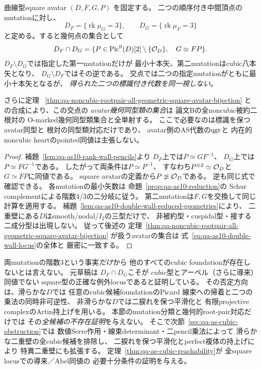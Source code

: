 \begin{proposition}[二つの最小十本矢壁と二捩れ交点]
\label{prop:qa-as10-double-wall-characterization}
曲線型square avatar $(D,F,G,P)$ を固定する。
二つの順序付き中間頂点のmutationに対し、
\[
 D_F=\{\operatorname{rk}\mu_G=3\},\qquad
 D_G=\{\operatorname{rk}\mu_F=3\}
\]
と定める。すると幾何点の集合として
\begin{equation}
 D_F\cap D_G=
 \{P\in\operatorname{Pic}^0(D)[2]\setminus\{\mathcal O_D\},\quad
     G\simeq FP\}.
 \label{eq:qa-as10-double-wall-locus}
\end{equation}
$D_F\setminus D_G$では指定した第一mutationだけが
最小十本矢、第二mutationはcubic八本矢となり、
$D_G\setminus D_F$ではその逆である。
交点では二つの指定mutationがともに最小十本矢となるが、
\emph{得られた二つの標識付き代数を同一視しない}。

さらに定理
~\ref{thm:qa-noncubic-rootpair-all-geometric-square-avatar-bijection}
との合成により、この交点の
\emph{avatar幾何同型類の集合}は
論文Bの全noncubic被約二根対の
O-marked幾何同型類集合と全単射する。
ここで必要なのは標識を保つavatar同型と
根対の同型類対応だけであり、
avatar側のAS代数の$\operatorname{qgr}$と
内在的noncubic heartのpointed同値は主張しない。
\end{proposition}
\begin{proof}
補題~\ref{lem:qa-as10-rank-wall-pencils}より
$D_F$上では$P\simeq GF^{-1}$、
$D_G$上では$P\simeq FG^{-1}$である。
したがって両条件は$P\simeq P^{-1}$、
すなわち$P^{\otimes2}\simeq\mathcal O_D$と
$G\simeq FP$に同値である。
square avatarの定義から$P\not\simeq\mathcal O_D$である。
逆も同じ式で確認できる。
各mutationの最小矢数は
命題~\ref{prop:qa-as10-reduction}の
Schur complementによる階数4/3の二分岐に従う。
第二mutationは$F,G$を交換して同じ計算を適用する。
補題~\ref{lem:qa-as10-double-wall-reduced-geometries}により、
二重壁にある$D$はsmooth/nodal/$I_2$の三型だけで、
非被約型・cuspidal型・接する二成分型は出現しない。
従って後述の
定理~\ref{thm:qa-noncubic-rootpair-all-geometric-square-avatar-bijection}
が扱うavatarの集合は
式~\eqref{eq:qa-as10-double-wall-locus}の全体と
厳密に一致する。
\end{proof}

\begin{remark}[cubicへの到達不能性には別の証明が必要]
\label{rem:qa-as10-two-walls-not-full-obstruction}
両mutationの階数3という事実\emph{だけ}から
他のすべてのcubic foundationが存在しないとは言えない。
元草稿\cite[定理21.1・35.1]{AvatarVSeven2026}は
$D_F\cap D_G$こそが
$cubic$型とアーベル（さらに導来）同値でない
square型の正確な例外locusであると証明している。
その否定方向は、滑らかな$D$では
任意のcubic候補foundationのPicard
線束への帰着と二つの乗法の同時非可逆性、
非滑らかな$D$では二捩れを保つ平滑化と
有限projective complexのArtin持上げを用いる。
本節のmutation分類と幾何的root-pair対応だけでは
その\emph{全候補の不存在証明}を与えない。
そこで次節~\ref{sec:qa-as-cubic-obstruction}では
数値Serre作用・線束determinant・二pencil乗法によって
滑らかな二重壁の全cubic候補を排除し、
二捩れを保つ平滑化とperfect複体の持上げにより
特異二重壁にも拡張する。
定理~\ref{thm:qa-as-cubic-reachability}が
全square locusでの導来／Abel同値の
必要十分条件の証明を与える。
\end{remark}

